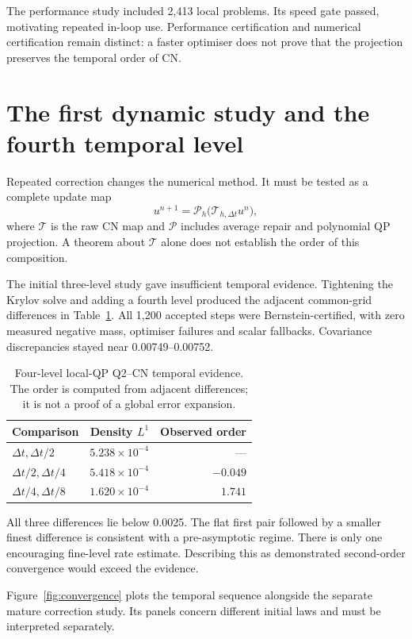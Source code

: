 The performance study included 2,413 local problems. Its speed gate passed, motivating repeated in-loop use. Performance certification and numerical certification remain distinct: a faster optimiser does not prove that the projection preserves the temporal order of CN.

\section{The first dynamic study and the fourth temporal level}
Repeated correction changes the numerical method. It must be tested as a complete update map
\begin{equation}
 u^{n+1}=\mathcal P_h\bigl(\mathcal T_{h,\Delta t}u^n\bigr),
\end{equation}
where $\mathcal T$ is the raw CN map and $\mathcal P$ includes average repair and polynomial QP projection. A theorem about $\mathcal T$ alone does not establish the order of this composition.

The initial three-level study gave insufficient temporal evidence. Tightening the Krylov solve and adding a fourth level produced the adjacent common-grid differences in Table~\ref{tab:temporal}. All 1,200 accepted steps were Bernstein-certified, with zero measured negative mass, optimiser failures and scalar fallbacks. Covariance discrepancies stayed near 0.00749--0.00752.
\begin{table}[htbp]\centering
\caption{Four-level local-QP Q2--CN temporal evidence. The order is computed from adjacent differences; it is not a proof of a global error expansion.}\label{tab:temporal}
\begin{tabular}{lrr}\toprule Comparison & Density $L^1$ & Observed order\\\midrule
$\Delta t,\Delta t/2$ & $5.238\times10^{-4}$ & ---\\
$\Delta t/2,\Delta t/4$ & $5.418\times10^{-4}$ & $-0.049$\\
$\Delta t/4,\Delta t/8$ & $1.620\times10^{-4}$ & $1.741$\\\bottomrule\end{tabular}
\end{table}
All three differences lie below 0.0025. The flat first pair followed by a smaller finest difference is consistent with a pre-asymptotic regime. There is only one encouraging fine-level rate estimate. Describing this as demonstrated second-order convergence would exceed the evidence.

Figure~\ref{fig:convergence} plots the temporal sequence alongside the separate mature correction study. Its panels concern different initial laws and must be interpreted separately.


